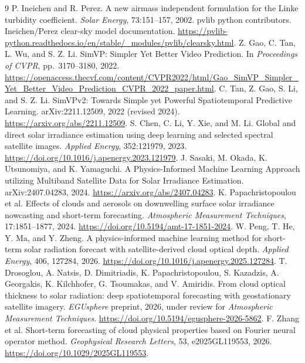 \documentclass[11pt]{article}
\begin{document}
\begin{thebibliography}{9}\small
{}
P. Ineichen and R. Perez.
A new airmass independent formulation for the Linke turbidity coefficient.
\textit{Solar Energy}, 73:151--157, 2002.
pvlib python contributors.
Ineichen/Perez clear-sky model documentation.
\url{https://pvlib-python.readthedocs.io/en/stable/_modules/pvlib/clearsky.html}.
Z. Gao, C. Tan, L. Wu, and S. Z. Li.
SimVP: Simpler Yet Better Video Prediction.
In \textit{Proceedings of CVPR}, pp.~3170--3180, 2022.
\url{https://openaccess.thecvf.com/content/CVPR2022/html/Gao_SimVP_Simpler_Yet_Better_Video_Prediction_CVPR_2022_paper.html}.
C. Tan, Z. Gao, S. Li, and S. Z. Li.
SimVPv2: Towards Simple yet Powerful Spatiotemporal Predictive Learning.
arXiv:2211.12509, 2022 (revised 2024).
\url{https://arxiv.org/abs/2211.12509}.
S. Chen, C. Li, Y. Xie, and M. Li.
Global and direct solar irradiance estimation using deep learning and selected spectral satellite images.
\textit{Applied Energy}, 352:121979, 2023.
\url{https://doi.org/10.1016/j.apenergy.2023.121979}.
J. Sasaki, M. Okada, K. Utsunomiya, and K. Yamaguchi.
A Physics-Informed Machine Learning Approach utilizing Multiband Satellite Data for Solar Irradiance Estimation.
arXiv:2407.04283, 2024.
\url{https://arxiv.org/abs/2407.04283}.
K. Papachristopoulou et al.
Effects of clouds and aerosols on downwelling surface solar irradiance nowcasting and short-term forecasting.
\textit{Atmospheric Measurement Techniques}, 17:1851--1877, 2024.
\url{https://doi.org/10.5194/amt-17-1851-2024}.
W. Peng, T. He, Y. Ma, and Y. Zheng.
A physics-informed machine learning method for short-term solar radiation forecast with satellite-derived cloud optical depth.
\textit{Applied Energy}, 406, 127284, 2026.
\url{https://doi.org/10.1016/j.apenergy.2025.127284}.
T. Drosoglou, A. Natsis, D. Dimitriadis, K. Papachristopoulou, S. Kazadzis, A. Georgakis, K. Kilchhofer, G. Tsoumakas, and V. Amiridis.
From cloud optical thickness to solar radiation: deep spatiotemporal forecasting with geostationary satellite imagery.
\textit{EGUsphere} preprint, 2026, under review for \textit{Atmospheric Measurement Techniques}.
\url{https://doi.org/10.5194/egusphere-2026-5862}.
F. Zhang et al.
Short-term forecasting of cloud physical properties based on Fourier neural operator method.
\textit{Geophysical Research Letters}, 53, e2025GL119553, 2026.
\url{https://doi.org/10.1029/2025GL119553}.
\end{thebibliography}
\end{document}
